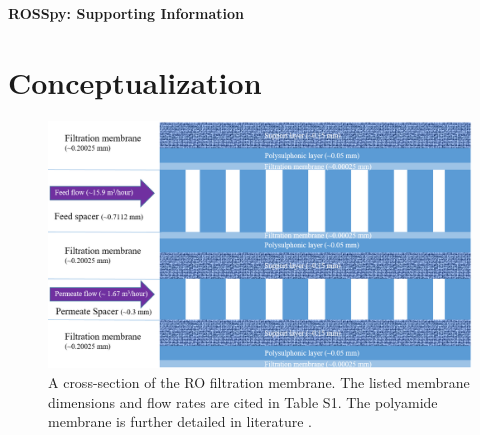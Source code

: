 \documentclass[fleqn,10pt]{wlscirep}
\newcommand{\beginsupplement}{%
        \setcounter{table}{0}
        \renewcommand{\thetable}{S\arabic{table}}%
        \setcounter{figure}{0}
        \renewcommand{\thefigure}{S\arabic{figure}}%
        \setcounter{equation}{0}
        \renewcommand{\theequation}{S\arabic{equation}}%
     }
\begin{document}

{\huge \textbf{ROSSpy: Supporting Information}}


\beginsupplement

\tableofcontents
\listoffigures
\listoftables
\newpage

\section{Conceptualization}

\begin{figure}[h]
    \centering
    \includegraphics[width = \textwidth]{../images/supporting_information/membrane_scheme_3.PNG}
    \caption{
        A cross-section of the RO filtration membrane. The listed membrane dimensions and flow rates are cited in Table S1. The polyamide membrane is further detailed in literature \cite{Strubbe2018CalibrationFull-Scale}. 
    }
    \label{membrane_scheme}
\end{figure}
\end{document}
